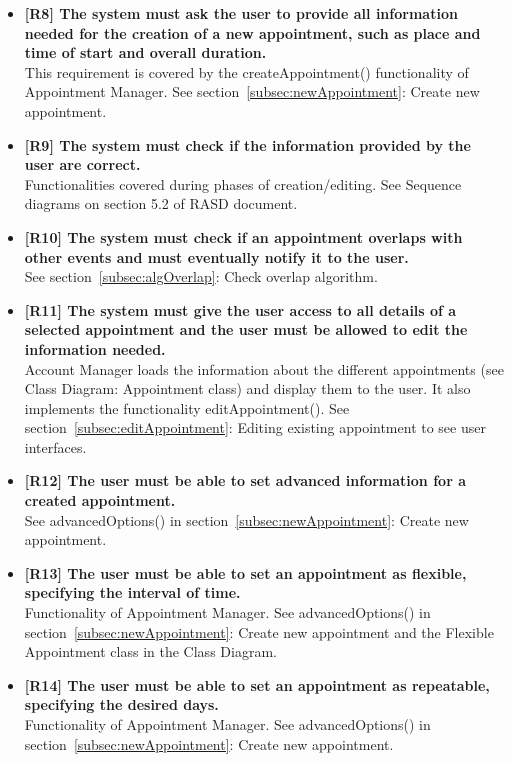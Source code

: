 \begin{itemize}
\item \textbf{[R8] The system must ask the user to provide all information needed for the creation of a new
appointment, such as place and time of start and overall duration.}\\
This requirement is covered by the createAppointment() functionality of Appointment Manager. See section~\ref{subsec:newAppointment}: Create new appointment.

\item \textbf{[R9] The system must check if the information provided by the user are correct.}\\
Functionalities covered during phases of creation/editing. See Sequence diagrams on section 5.2 of RASD document.

\item \textbf{[R10] The system must check if an appointment overlaps with other events and must eventually
notify it to the user.}\\
See section~\ref{subsec:algOverlap}: Check overlap algorithm.

\item \textbf{[R11] The system must give the user access to all details of a selected appointment and the user
must be allowed to edit the information needed.}\\
Account Manager loads the information about the different appointments (see Class Diagram: Appointment class) and display them to the user. It also implements the functionality editAppointment(). See section~\ref{subsec:editAppointment}: Editing existing appointment to see user interfaces.

\item \textbf{[R12] The user must be able to set advanced information for a created appointment.}\\
See advancedOptions() in section~\ref{subsec:newAppointment}: Create new appointment.

\item \textbf{[R13] The user must be able to set an appointment as flexible, specifying the interval of time.}\\
Functionality of Appointment Manager. See advancedOptions() in section~\ref{subsec:newAppointment}: Create new appointment and the Flexible Appointment class in the Class Diagram.

\item \textbf{[R14] The user must be able to set an appointment as repeatable, specifying the desired days.}\\
Functionality of Appointment Manager. See advancedOptions() in section~\ref{subsec:newAppointment}: Create new appointment.


\end{itemize}
